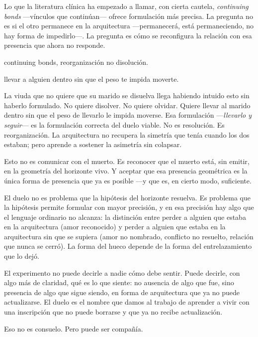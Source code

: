 \noindent Lo que la literatura clínica ha empezado a llamar, con cierta cautela, \emph{continuing bonds} —vínculos que continúan— ofrece formulación más precisa. La pregunta no es si el otro permanece en la arquitectura —permanecerá, está permaneciendo, no hay forma de impedirlo—. La pregunta es cómo se reconfigura la relación con esa presencia que ahora no responde.

\begin{fisica}
 continuing bonds, reorganización no disolución.

 llevar a alguien dentro sin que el peso te impida moverte.
\end{fisica}
La viuda que no quiere que su marido se disuelva llega habiendo intuido esto sin haberlo formulado. No quiere disolver. No quiere olvidar. Quiere llevar al marido dentro sin que el peso de llevarlo le impida moverse. Esa formulación —\emph{llevarlo y seguir}— es la formulación correcta del duelo viable. No es resolución. Es reorganización. La arquitectura no recupera la simetría que tenía cuando los dos estaban; pero aprende a sostener la asimetría sin colapsar.

Esto no es comunicar con el muerto. Es reconocer que el muerto está, sin emitir, en la geometría del horizonte vivo. Y aceptar que esa presencia geométrica es la única forma de presencia que ya es posible —y que es, en cierto modo, suficiente.

\noindent El duelo no es problema que la hipótesis del horizonte resuelva. Es problema que la hipótesis permite formular con mayor precisión, y en esa precisión hay algo que el lenguaje ordinario no alcanza: la distinción entre perder a alguien que estaba en la arquitectura (amor reconocido) y perder a alguien que estaba en la arquitectura sin que se supiera (amor no nombrado, conflicto no resuelto, relación que nunca se cerró). La forma del hueco depende de la forma del entrelazamiento que lo dejó.

El experimento no puede decirle a nadie cómo debe sentir. Puede decirle, con algo más de claridad, qué es lo que siente: no ausencia de algo que fue, sino presencia de algo que sigue siendo, en forma de arquitectura que ya no puede actualizarse. El duelo es el nombre que damos al trabajo de aprender a vivir con una inscripción que no puede borrarse y que ya no recibe actualización.

Eso no es consuelo. Pero puede ser compañía.


